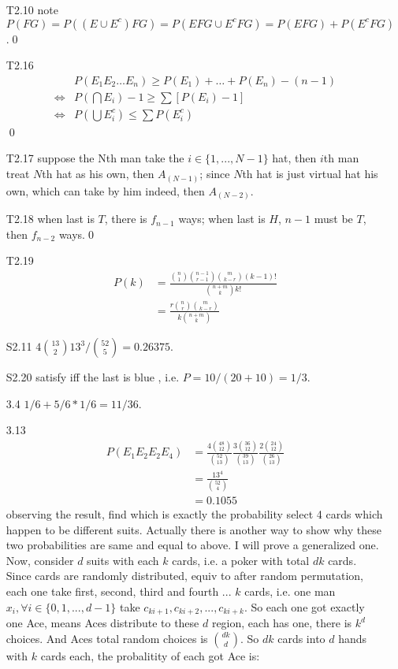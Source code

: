 \documentclass[paper=a4, fontsize=11pt]{scrartcl} %
\numberwithin{equation}{section} %
\numberwithin{figure}{section} %
\numberwithin{table}{section} %
\begin{document}
\begin{itemize}
	\item[T2.10] note $P(FG) = P((E\cup E^c)FG)= P(EFG\cup E^cFG)  = P(EFG)+P(E^cFG)$.\qed
	\item[T2.16] 
	\begin{align}
		& P(E_1E_2\dots E_n) \geq P(E_1)+\dots+P(E_n) -(n-1)\\
		\Leftrightarrow & P(\bigcap E_i)-1 \geq \sum [P(E_i)-1] \\
		\Leftrightarrow & P(\bigcup E_i^c) \leq \sum P(E_i^c)
	\end{align}\qed
	\item[T2.17] suppose the Nth man take the $i\in\{1,...,N-1\}$ hat, then $i$th man treat $N$th hat as his own, then $A_(N-1)$; since $N$th hat is just virtual hat his own, which can take by him indeed, then $A_(N-2)$.\
	\item[T2.18] when last is $T$, there is $f_{n-1}$ ways; when last is $H$, $n-1$ must be $T$, then $f_{n-2}$ ways.\qed
	\item[T2.19]
	\begin{align}
		P(k) &= \frac{ {n\choose 1}{n-1 \choose r-1}{m \choose k-r} (k-1)! }{ {n+m\choose k} k!} \\
			&= \frac{ r{n\choose r}{m\choose k-r}}{k{n+m\choose k }}
	\end{align}
	\item[S2.11] $4{13\choose 2} 13^3 / {52 \choose 5} = 0.26375$.
	\item[S2.20] satisfy iff the last is blue , i.e. $P = 10/(20+10) = 1/3$.
	\item[3.4] $1/6 + 5/6 * 1/6 = 11/36$.
	\item[3.13]
	\begin{align}
		P(E_1E_2E_2E_4)  &= \frac{4 {48\choose 12}}{{52\choose 13}} \frac{3 {36\choose 12}}{{39\choose 13}} \frac{2 {24\choose 12}}{{26\choose 13}} \\
		&= \frac{13^4}{{52\choose 4} } \\
		&= 0.1055
	\end{align}
	observing the result, find which is exactly the probability select 4 cards which happen to be different suits. Actually there is another way to show why these two probabilities are same and equal to above. I will prove a generalized one.\\
	Now, consider $d$ suits with each $k$ cards, i.e. a poker with total $dk$ cards. Since cards are randomly distributed, equiv to after random permutation, each one take first, second, third and fourth ... $k$ cards, i.e. one man $x_i, \forall i\in\{0,1,...,d-1\}$ take $c_{ki+1},c_{ki+2},...,c_{ki+k}$. So each one got exactly one Ace, means Aces distribute to these $d$ region, each has one, there is $k^d$ choices. And Aces total random choices is ${dk \choose d}$. So $dk$ cards into $d$ hands with $k$ cards each, the probalitity of each got Ace is:

\end{itemize}
\end{document}
